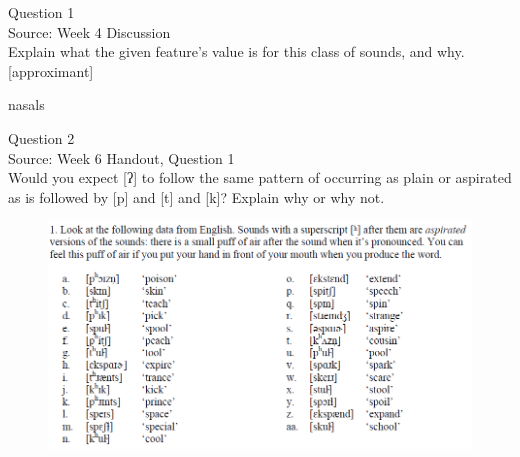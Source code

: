 \documentclass[12pt]{article}
\begin{document}
\begin{center}
\textbf{{\color{violet}{\HUGE 20201021 Wednesday\\}}}

\textbf{{\color{violet}{\HUGE ALL EXAMS\\}}}

\end{center}
\newpage

\begin{center}
\textbf{{\color{blue}{\HUGE START OF EXAM\\}}}

\textbf{{\color{blue}{\HUGE Student ID: 62089\\}}}

\textbf{{\color{blue}{\HUGE 4:00\\}}}

\end{center}
\newpage

{\large Question 1}\\

Source: Week 4 Discussion\\

Explain what the given feature’s value is for this class of sounds, and why.\\

{[approximant]}

nasals


\newpage

{\large Question 2}\\

Source: Week 6 Handout, Question 1\\

Would you expect [ʔ] to follow the same pattern of occurring as plain or aspirated as is followed by [p] and [t] and [k]? Explain why or why not.\\

\begin{figure}[H]
\includegraphics{../images/aspiration.png}
\end{figure}
\end{document}
